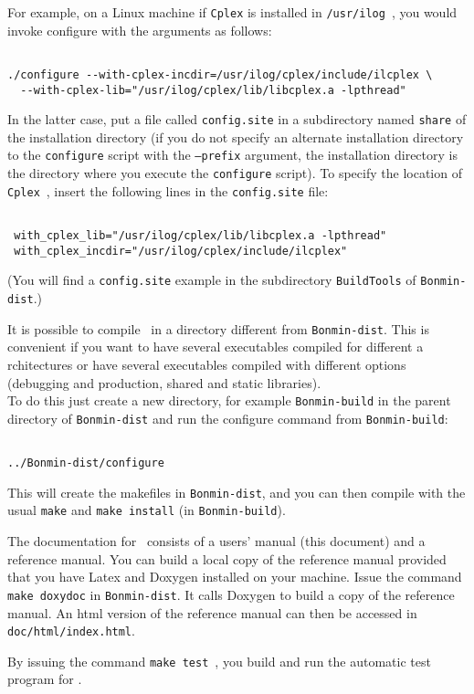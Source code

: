 For example, on a Linux machine if {\tt Cplex} is installed in {\tt /usr/ilog}~, you would
invoke configure with the arguments as follows:
\begin{verbatim}

./configure --with-cplex-incdir=/usr/ilog/cplex/include/ilcplex \
  --with-cplex-lib="/usr/ilog/cplex/lib/libcplex.a -lpthread"
 \end{verbatim}
In the latter case, put a file called {\tt config.site} in a subdirectory named
{\tt share} of the installation directory (if you do not specify an alternate
installation directory to the {\tt configure} script with the {\tt --prefix}
argument, the installation directory is the directory where you execute the
{\tt configure} script). To specify the location of {\tt Cplex}~, insert the
following lines in the {\tt config.site} file:
 \begin{verbatim}

 with_cplex_lib="/usr/ilog/cplex/lib/libcplex.a -lpthread"
 with_cplex_incdir="/usr/ilog/cplex/include/ilcplex"
 \end{verbatim}
 (You will find a {\tt config.site} example in the subdirectory {\tt BuildTools} of {\tt Bonmin-dist}.)

It is possible to compile \Bonmin\ in a directory different from {\tt Bonmin-dist}.
This is convenient if you want to have several executables compiled for different a
rchitectures or have several executables compiled with different options
(debugging and production, shared and static libraries).\\

To do this just create a new directory, for example {\tt Bonmin-build} in the parent directory of
{\tt Bonmin-dist} and run the configure command from {\tt Bonmin-build}:
\begin{verbatim}

../Bonmin-dist/configure

\end{verbatim}
This will create the makefiles in {\tt Bonmin-dist}, and
you can then compile with the usual {\tt make} and {\tt make install}
(in {\tt Bonmin-build}).

The documentation for \Bonmin\ consists of a users' manual (this document) and a reference manual.
You can build a local copy of the reference manual provided that you have Latex
and Doxygen installed on your machine. Issue the command {\tt make
doxydoc} in {\tt Bonmin-dist}. It calls Doxygen to build a copy of the
reference manual. An html version of the reference manual can then
be accessed in {\tt doc/html/index.html}.


By issuing the command {\tt make test}~, you build and run the automatic test program for \Bonmin.
